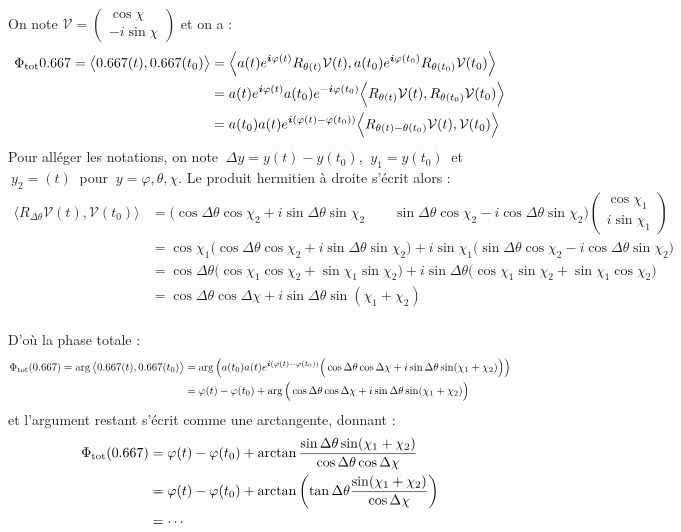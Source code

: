 On note $\mathcal{V} = \begin{pmatrix} \cos\chi \\ -i\sin\chi \end{pmatrix}$ et on a :
\begin{align*}
	\phaset{\x} = \big\langle \x(t), \x(t_0)\big\rangle &= \Big\langle a(t)e^{\i \varphi(t)}R_{\theta(t)}\mathcal{V}(t), a(t_0)e^{\i \varphi(t_0)}R_{\theta(t_0)}\mathcal{V}(t_0) \Big\rangle \\
	&= a(t)e^{\i \varphi(t)} a(t_0)e^{-\i \varphi(t_0)} \Big\langle R_{\theta(t)}\mathcal{V}(t), R_{\theta(t_0)}\mathcal{V}(t_0) \Big\rangle \\
	&= a(t_0)a(t)e^{\i (\varphi(t)-\varphi(t_0))}\Big\langle R_{\theta(t)- \theta(t_0)}\mathcal{V}(t), \mathcal{V}(t_0) \Big\rangle
\end{align*}
Pour alléger les notations, on note $\ \Delta y =y(t)-y(t_0)$, $\ y_1=y(t_0)\ $ et $\ y_2=(t)\ $ pour $\ y=\varphi,\theta,\chi$. Le produit hermitien à droite s'écrit alors :
\begin{align*}
	\Big\langle R_{\Delta\theta}\mathcal{V}(t), \mathcal{V}(t_0) \Big\rangle &=   \Big(\cos\Delta\theta \cos\chi_2 + i\sin\Delta\theta \sin\chi_2 \qquad \sin\Delta\theta \cos\chi_2 - i\cos\Delta\theta \sin\chi_2\Big) \begin{pmatrix} \cos\chi_1 \\ i\sin\chi_1 \end{pmatrix} \\
	&= \cos\chi_1\Big(\cos\Delta\theta \cos\chi_2 + i\sin\Delta\theta \sin\chi_2\Big) + i\sin\chi_1\Big(\sin\Delta\theta \cos\chi_2 - i\cos\Delta\theta \sin\chi_2\Big) \\
	&= \cos\Delta\theta \Big(\cos\chi_1 \cos\chi_2 + \sin\chi_1 \sin\chi_2\Big) + i\sin\Delta\theta \Big( \cos\chi_1 \sin\chi_2 + \sin\chi_1\cos\chi_2\Big) \\
	&= \cos\Delta\theta \cos\Delta\chi + i\sin\Delta\theta \sin(\chi_1+\chi_2)
\end{align*}
\\
D'où la phase totale :
\begin{align*}
	\phaset(\x) = \arg\big\langle \x(t), \x(t_0)\big\rangle &= \arg\left( a(t_0)a(t)e^{\i (\varphi(t) - \varphi(t_0))}\Big( \cos\Delta\theta \cos\Delta\chi + i\sin\Delta\theta \sin(\chi_1+\chi_2) \Big) \right) \\
	&= \varphi(t) - \varphi(t_0) + \arg\Big( \cos\Delta\theta \cos\Delta\chi + i\sin\Delta\theta \sin(\chi_1+\chi_2) \Big)
\end{align*}
et l'argument restant s'écrit comme une arctangente, donnant :
\begin{align*}
	\phaset(\x) &= \varphi(t)-\varphi(t_0) + \arctan\frac{\sin\Delta\theta \sin(\chi_1+\chi_2)}{\cos\Delta\theta \cos\Delta\chi} \\
	&= \varphi(t)-\varphi(t_0) + \arctan \left( \tan\Delta\theta\frac{\sin(\chi_1+\chi_2)}{\cos\Delta\chi} \right) \\
	&= \cdots
\end{align*}
\skipl




